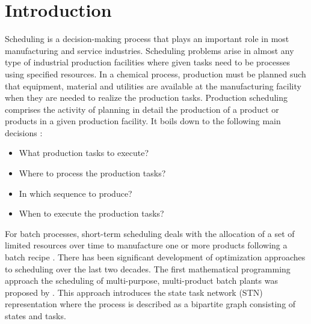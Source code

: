 \chapter{Introduction}
\thispagestyle{plain}

Scheduling is a decision-making process that plays an important role in most manufacturing and service industries. %
Scheduling problems arise in almost any type of industrial production facilities where given tasks need to be processes using specified resources. In a chemical process, production must be planned such that equipment, material and utilities are available at the manufacturing facility when they are needed to realize the production tasks. Production scheduling comprises the activity of planning in detail the production of a product or products in a given production facility. It boils down to the following main decisions \citep{HARJUNKOSKI2014161}:
\begin{itemize}
\item What production tasks to execute?
\item Where to process the production tasks?
\item In which sequence to produce?
\item When to execute the production tasks?
\end{itemize}

For batch processes, short-term scheduling deals with the allocation of a set of limited resources over time to manufacture one or more products following a batch recipe \citep{MENDEZ}. There has been significant development of optimization approaches to scheduling over the last two decades. The first mathematical programming approach the scheduling of multi-purpose, multi-product batch plants was proposed by \cite{KONDILI1993211}. This approach introduces the state task network (STN) representation where the process is described as a bipartite graph consisting of states and tasks.